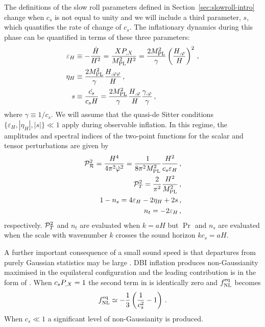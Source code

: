 The definitions of the slow roll parameters defined in
Section~\ref{sec:slowroll-intro} 
change when $c_s$ is not equal to unity and we
will include a third parameter, $s$, which quantifies the rate of change of $c_s$.
The inflationary dynamics during this phase can  
be quantified in terms of these three parameters: 
% 
\begin{align}
\label{eq:epsdefn-dbiintro}
\varepsilon_H &\equiv -\frac{\dot{H}}{H^2}
= \frac{XP_{,X}}{M_{\mathrm{PL}}^2H^2} 
= \frac{2M_{\mathrm{PL}}^2}{\gamma} \left( \frac{H_{,\varphi}}{H} \right)^2 \,,\\
\label{eq:defeta-dbiintro}
\eta_H &\equiv  \frac{2M_{\mathrm{PL}}^2}{\gamma}\frac{H_{,\varphi\varphi}}{H} \,,\\
\label{eq:defs-dbiintro}
s &\equiv \frac{\dot{c_s}}{c_sH} 
= \frac{2M_{\mathrm{PL}}^2}{\gamma} \frac{H_{,\varphi}}{H}\frac{\gamma_{,\varphi}}{\gamma}  \,,
\end{align}
% 
where $\gamma \equiv 1/c_s$. 
We will assume that the quasi-de Sitter conditions 
$\{ \varepsilon_H, |\eta_H | , |s | \}  \ll 1$ apply during observable inflation. 
In this regime, the amplitudes and spectral indices of the two-point functions 
for the scalar and tensor perturbations are given by \cite{gm}
% 
\begin{eqnarray}
\label{eq:spectra-dbiintro}
\mathcal{P}_{\mathcal{R}}^2 = \frac{H^4}{4\pi^2\dot{\varphi}^2} =\frac{1}{8 \pi^2 M_{\mathrm{PL}}^2}
\frac{H^2}{c_s \varepsilon_H}\,,
\\
\mathcal{P}_T^2 = \frac{2}{\pi^2} \frac{H^2}{M_{\mathrm{PL}}^2} \,,
\\
\label{indices}
1-n_s = 4 \varepsilon_H -2\eta_H  +2s \,,
\\
 n_t = -2\varepsilon_H  \,,
\end{eqnarray}
% 
respectively. $\mathcal{P}_T^2$ and $n_t$ are evaluated when $k=aH$ but $\Pr$ and $n_s$ are
evaluated 
when the scale with wavenumber $k$ crosses 
the sound horizon $k c_s = aH$.  



A further important consequence of a small sound speed is that departures  
from purely Gaussian statistics may be large 
\cite{brane6,brane11,lidser3,chenetal}. 
DBI inflation produces non-Gaussianity maximised in the equilateral
configuration and the leading contribution is in the form of
. 
When $c_sP_{,X}=1$ the second term in 
 is identically zero and $f_{\mathrm{NL}}^{\mathrm{eq}}$ becomes
\cite{chenetal,lidser2}
% 
\begin{equation}
\label{eq:fnlcs-dbiintro}
f_{\mathrm{NL}}^{\mathrm{eq}} \simeq -\frac{1}{3} \left( \frac{1}{c_s^2} -1 \right) \,.
\end{equation}
% 
When $c_s\ll1$ a significant level of non-Gaussianity is produced.

